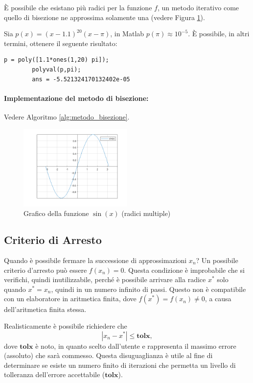 È possibile che esistano più radici per la funzione $f$, un metodo iterativo come quello di bisezione ne approssima solamente una (vedere Figura \ref{fig:sinx}).


\begin{example}
	Sia $p(x)=(x-1.1)^{20}(x-\pi)$, in Matlab $p(\pi)\approx 10^{-5}$. È possibile, in altri termini, ottenere il seguente risultato:
	\begin{lstlisting}[style=Matlab-editor]
		p = poly([1.1*ones(1,20) pi]);
		polyval(p,pi);
		ans = -5.521324170132402e-05
	\end{lstlisting}
\end{example}

\paragraph{Implementazione del metodo di bisezione:} Vedere Algoritmo \ref{alg:metodo_bisezione}.

\begin{figure}
	\centering
	\includegraphics[width=0.5\textwidth]{immagini/tripleRadix.png}
	\caption{\label{fig:sinx}Grafico della funzione $\sin{(x)}$ (radici multiple)}
\end{figure}

\subsection{Criterio di Arresto}\label{sec:critArresto}
Quando è possibile fermare la successione di approssimazioni $x_n$? Un possibile criterio d'arresto può essere $f(x_n)=0$. Questa condizione è improbabile che si verifichi, quindi inutilizzabile, perché è possibile arrivare alla radice $x^*$ solo quando $x^*=x_n$, quindi in un numero infinito di passi. Questo non è compatibile con un elaboratore in aritmetica finita, dove $f(x^*)=f(x_n)\neq 0$, a causa dell'aritmetica finita stessa.

Realisticamente è possibile richiedere che 
\begin{equation}\label{eq:x_n_leq_tolx}
	|x_n-x^*|\leq \boldsymbol{tolx},
\end{equation}
dove $\boldsymbol{tolx}$ è noto, in quanto scelto dall'utente e rappresenta il massimo errore (assoluto) che sarà commesso. Questa disuguaglianza è utile al fine di determinare se esiste un numero finito di iterazioni che permetta un livello di tolleranza dell'errore accettabile ($\boldsymbol{tolx}$).

